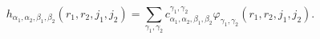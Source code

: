 \begin{equation}
h_{\alpha_1, \alpha_2, \beta_1, \beta_2} (r_1,r_2,j_1,j_2) =
\sum_{\gamma_1, \gamma_2} c_{\alpha_1, \alpha_2, \beta_1,
\beta_2}^{\gamma_1, \gamma_2} \varphi_{\gamma_1, \gamma_2}
(r_1,r_2,j_1,j_2).
\end{equation}

